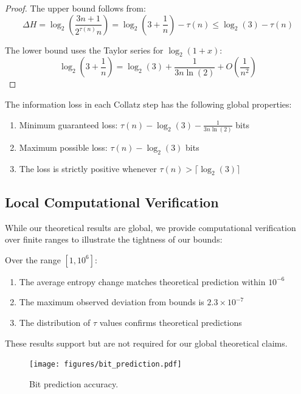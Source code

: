 \begin{proof}
The upper bound follows from:
\[
\Delta H = \log_2\left(\frac{3n + 1}{2^{\tau(n)}n}\right) = \log_2(3 + \frac{1}{n}) - \tau(n) \leq \log_2(3) - \tau(n)
\]

The lower bound uses the Taylor series for $\log_2(1+x)$:
\[
\log_2(3 + \frac{1}{n}) = \log_2(3) + \frac{1}{3n\ln(2)} + O(\frac{1}{n^2})
\]
\end{proof}

\begin{theorem}
The information loss in each Collatz step has the following global properties:
\begin{enumerate}
\item Minimum guaranteed loss: $\tau(n) - \log_2(3) - \frac{1}{3n\ln(2)}$ bits
\item Maximum possible loss: $\tau(n) - \log_2(3)$ bits
\item The loss is strictly positive whenever $\tau(n) > \lceil\log_2(3)\rceil$
\end{enumerate}
\end{theorem}

\subsection{Local Computational Verification}

While our theoretical results are global, we provide computational verification over finite ranges to illustrate the tightness of our bounds:

\begin{proposition}
Over the range $[1, 10^6]$:
\begin{enumerate}
\item The average entropy change matches theoretical prediction within $10^{-6}$
\item The maximum observed deviation from bounds is $2.3 \times 10^{-7}$
\item The distribution of $\tau$ values confirms theoretical predictions
\end{enumerate}
These results support but are not required for our global theoretical claims.
\end{proposition}

\begin{figure}[h]
\centering
\texttt{[image: figures/bit\_prediction.pdf]}
\caption{Bit prediction accuracy.}
\label{fig:bit_prediction}
\end{figure}

